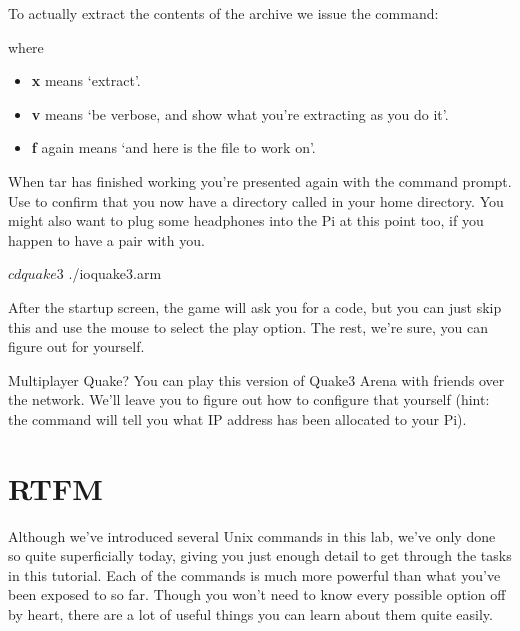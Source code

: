 \noindent To actually extract the contents of the archive we issue the command:


\noindent where

\begin{itemize}
\item \textbf{x} means `extract'.
\item \textbf{v} means `be verbose, and show what you're extracting as you do it'.
\item \textbf{f} again means `and here is the file to work on'.
\end{itemize}

\noindent When tar has finished working you're presented again with the command prompt. Use  to confirm that you now have a directory called  in your home directory.  You might also want to plug some headphones into the Pi at this point too, if you happen to have a pair with you. 

\begin{ttoutenv}
$ cd quake3
$ ./ioquake3.arm
\end{ttoutenv}

\noindent After the startup screen, the game will ask you for a code, but you can just skip this and use the mouse to select the play option. The rest, we're sure, you can figure out for yourself. 

\begin{diversion}{Multiplayer Quake?}
You can play this version of Quake3 Arena with friends over the network. We'll leave you to figure out how to configure that yourself (hint: the  command will tell you what IP address has been allocated to your Pi).
\end{diversion}

\FloatBarrier
\section{RTFM}

Although we've introduced several Unix commands in this lab, we've only done so quite superficially today, giving you just enough detail to get through the tasks in this tutorial. Each of the commands is much more powerful than what you've been exposed to so far. Though you won't need to know every possible option off by heart, there are a lot of useful things you can learn about them quite easily. 

